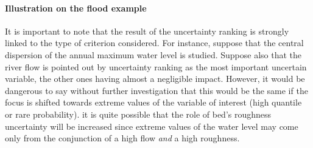 \paragraph{Illustration on the flood example}
\par

It is important to note that the result of the uncertainty ranking is strongly linked to the type of criterion considered. For instance, suppose that the central dispersion of the annual maximum water level is studied. Suppose also that the river flow is pointed out by uncertainty ranking as the most important uncertain variable, the other ones having almost a negligible impact. However, it would be dangerous to say without further investigation that this would be the same if the focus is shifted towards extreme values of the variable of interest (high quantile or rare probability). it is quite possible that the role of bed's roughness uncertainty will be increased since extreme values of the water level may come only from the conjunction of a high flow {\em and} a high roughness.

